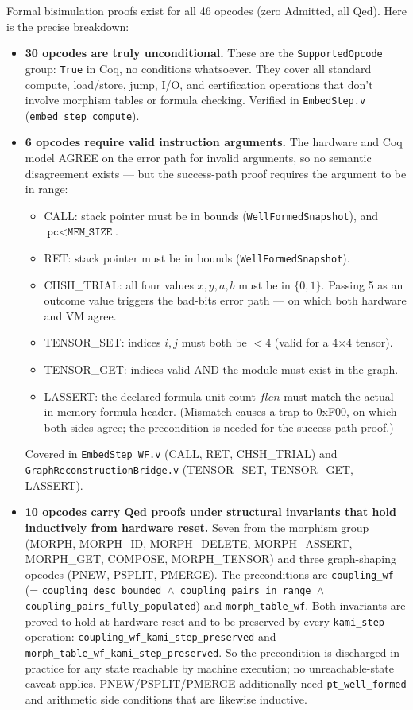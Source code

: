 \documentclass[11pt,a4paper]{article}
\theoremstyle{plain}
\theoremstyle{definition}
\theoremstyle{remark}
\begin{document}
Formal bisimulation proofs exist for all 46 opcodes (zero Admitted, all Qed). Here is the precise breakdown:
\begin{itemize}
\item \textbf{30 opcodes are truly unconditional.} These are the \texttt{SupportedOpcode} group: \texttt{True} in Coq, no conditions whatsoever. They cover all standard compute, load/store, jump, I/O, and certification operations that don't involve morphism tables or formula checking. Verified in \texttt{EmbedStep.v} (\texttt{embed\_step\_compute}).

\item \textbf{6 opcodes require valid instruction arguments.} The hardware and Coq model AGREE on the error path for invalid arguments, so no semantic disagreement exists --- but the success-path proof requires the argument to be in range:
  \begin{itemize}
  \item CALL: stack pointer must be in bounds (\texttt{WellFormedSnapshot}), and $\texttt{pc} < \texttt{MEM\_SIZE}$.
  \item RET: stack pointer must be in bounds (\texttt{WellFormedSnapshot}).
  \item CHSH\_TRIAL: all four values $x,y,a,b$ must be in $\{0,1\}$. Passing 5 as an outcome value triggers the bad-bits error path --- on which both hardware and VM agree.
  \item TENSOR\_SET: indices $i,j$ must both be $< 4$ (valid for a 4$\times$4 tensor).
  \item TENSOR\_GET: indices valid AND the module must exist in the graph.
  \item LASSERT: the declared formula-unit count $\mathit{flen}$ must match the actual in-memory formula header. (Mismatch causes a trap to 0xF00, on which both sides agree; the precondition is needed for the success-path proof.)
  \end{itemize}
  Covered in \texttt{EmbedStep\_WF.v} (CALL, RET, CHSH\_TRIAL) and \texttt{GraphReconstructionBridge.v} (TENSOR\_SET, TENSOR\_GET, LASSERT).

\item \textbf{10 opcodes carry Qed proofs under structural invariants that hold inductively from hardware reset.} Seven from the morphism group (MORPH, MORPH\_ID, MORPH\_DELETE, MORPH\_ASSERT, MORPH\_GET, COMPOSE, MORPH\_TENSOR) and three graph-shaping opcodes (PNEW, PSPLIT, PMERGE). The preconditions are \texttt{coupling\_wf} (= \texttt{coupling\_desc\_bounded $\wedge$ coupling\_pairs\_in\_range $\wedge$ coupling\_pairs\_fully\_populated}) and \texttt{morph\_table\_wf}. Both invariants are proved to hold at hardware reset and to be preserved by every \texttt{kami\_step} operation: \texttt{coupling\_wf\_kami\_step\_preserved} and \texttt{morph\_table\_wf\_kami\_step\_preserved}. So the precondition is discharged in practice for any state reachable by machine execution; no unreachable-state caveat applies. PNEW/PSPLIT/PMERGE additionally need \texttt{pt\_well\_formed} and arithmetic side conditions that are likewise inductive.
\end{itemize}
\end{document}
